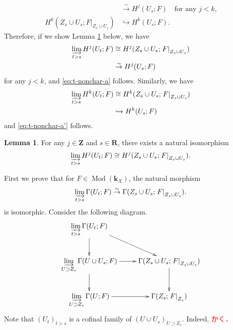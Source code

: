 ﻿\documentclass[a4paper,leqno]{jsarticle}
\makeatletter
\theoremstyle{definition}
\newtheorem{Lemma+}[Axiom+]{Lemma}
\newcommand{\zz}{\mathbf{Z}}
\newcommand{\rr}{\mathbf{R}}
\newcommand{\kk}{\mathbf{k}}
\newcommand{\Mod}{\mathop{\mathrm{Mod}}\nolimits}
\renewenvironment{proof}[1][\proofname]{\par
  \pushQED{\qed}%
  \normalfont \topsep6\p@\@plus6\p@\relax
  \trivlist
  \item[\hskip\labelsep
         \bfseries
    {#1}]\ignorespaces
}{%
  \popQED\endtrivlist\@endpefalse
}
\renewcommand{\proofname}{Proof.}
\numberwithin{equation}{section}
\newcommand{\simar}{\mathrel{\overset{\sim}{\rightarrow}}}%
\newcommand{\indlim}[1][]{\mathop{\varinjlim}\limits_{#1}}
\newcommand{\mres}[2][]{{\left.{#1}\right\rvert}_{#2}}
\theoremstyle{mystyle}
\makeatother
\begin{document}
\begin{proof}
\begin{align}
    &\simar
    H^{j}(U_{s};F)\quad
    \text{for any \(j< k\),}\\
    \label{eq:a-inj}H^{k}(Z_{s}\cup U_{s};\mres[F]{Z_{s}\cup U_{s}})
    &\hookrightarrow
    H^{k}(U_{s};F).
  \end{align}
  Therefore, if we show Lemma \ref{clm:ind-nonchar} below, 
  we have 
  \begin{align*}
    \indlim[t>s]H^{j}(U_t;F)
    &\cong 
    H^{j}(Z_{s}\cup U_{s};\mres[F]{Z_{s}\cup U_{s}})\\
    &\simar
    H^{j}(U_s;F)
  \end{align*}
  for any \(j<k\), and \ref{eq:t-nonchar-a} follows. 
  Similarly, 
  we have
  \begin{align*}
    \indlim[t>s]H^{k}(U_t;F)
    &\cong 
    H^{k}(Z_{s}\cup U_{s};\mres[F]{Z_{s}\cup U_{s}})\\
    &\hookrightarrow
    H^{k}(U_s;F)
  \end{align*}
  and \ref{eq:t-nonchar-a'} follows. 
  \begin{Lemma+}\label{clm:ind-nonchar}
    For any \(j\in\zz\) and \(s\in\rr\), there exists a natural isomorphism 
    \[
      \indlim[t>s]H^{j}(U_t;F)
      \cong 
      H^{j}(Z_{s}\cup U_{s};\mres[F]{Z_{s}\cup U_{s}}).
    \]
  \end{Lemma+}

  \begin{proof}[Proof of Lemma \ref{clm:ind-nonchar}]
    First we prove that 
    for \(F\in \Mod(\kk_X)\), 
    the natural morphism
    \begin{equation}\label{eq:qis-claim}
      \indlim[t>s]\Gamma(U_t;F)
      \simar 
      \Gamma(Z_{s}\cup U_{s};\mres[F]{Z_{s}\cup U_{s}}).
    \end{equation}
    is isomorphic. 
    Consider the following diagram. 
    \[\vcenter{\xymatrix{
      \indlim[t>s]\Gamma(U_t;F)
      \ar[rd]
      \ar[d]
      &
      \\
      \indlim[U\supset Z_{s}]
      \Gamma(U\cup U_{s};F)
      \ar[d]
      \ar[r]
      &
      \Gamma(Z_{s}\cup U_{s};\mres[F]{Z_{s}\cup U_{s}})
      \ar[d]
      \\
      \indlim[U\supset Z_{s}]
      \Gamma(U;F)
      \ar[r]
      &
      \Gamma(Z_{s};\mres[F]{Z_{s}})
    }}
    \] 
    Note that 
    \(\left(U_{t}\right)_{t>s}\) is a 
    cofinal family of \((U\cup U_{s})_{U\supset Z_{s}}\). 
    Indeed, 
    \textcolor{red}{かく．}


\end{proof}
\end{proof}
\end{document}
